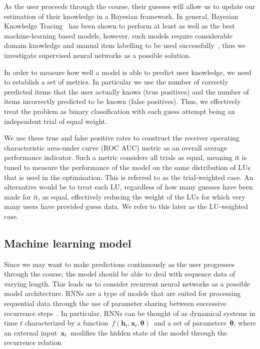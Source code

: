 As the user proceeds through the course, their guesses will allow us to update our estimation of their knowledge in a Bayesian framework. In general, Bayesian Knowledge Tracing~\cite{corbett1994knowledge} has been shown to perform at least as well as the best machine-learning based models, however, such models require considerable domain knowledge and manual item labelling to be used successfully~\cite{khajah2016deep}, thus we investigate supervised neural networks as a possible solution.

In order to measure how well a model is able to predict user knowledge, we need to establish a set of metrics. In particular we use the number of correctly predicted items that the user actually knows (true positives) and the number of items incorrectly predicted to be known (false positives). Thus, we effectively treat the problem as binary classification with each guess attempt being an independent trial of equal weight.

We use these true and false positive rates to construct the receiver operating characteristic area-under curve (ROC AUC) metric as an overall average performance indicator. Such a metric considers all trials as equal, meaning it is tuned to measure the performance of the model on the same distribution of LUs that is used in the optimisation. This is referred to as the trial-weighted case. An alternative would be to treat each LU, regardless of how many guesses have been made for it, as equal, effectively reducing the weight of the LUs for which very many users have provided guess data. We refer to this later as the LU-weighted case.

\subsection{Machine learning model}
\label{sec:nlp_model}
Since we may want to make predictions continuously as the user progresses through the course, the model should be able to deal with sequence data of varying length. This leads us to consider recurrent neural networks as a possible model architecture. RNNs are a type of models that are suited for processing sequential data through the use of parameter sharing between successive recurrence steps~\cite{rumelhart1986}. In particular, RNNs can be thought of as dynamical systems in time $t$ characterized by a function~$f(\mathbf{h}_t, \mathbf{x}_t, \mathbf{\theta})$~and a set of parameters~$\mathbf{\theta}$, where an external input~$\mathbf{x}_t$~modifies the hidden state of the model through the recurrence relation

